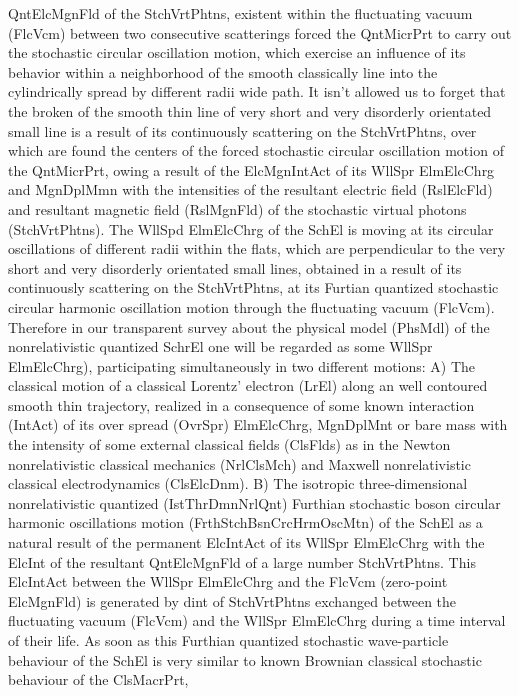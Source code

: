 \documentclass[12pt]{article}
\begin{document}
QntElcMgnFld of the StchVrtPhtns, existent within the fluctuating vacuum
(FlcVcm) between two consecutive scatterings forced the QntMicrPrt to carry 
out the stochastic circular oscillation motion, which exercise an influence
of its behavior within a neighborhood of the smooth classically line into
the cylindrically spread by different radii wide path. It isn't allowed us
to forget that the broken of the smooth thin line of very short and very
disorderly orientated small line is a result of its continuously scattering
on the StchVrtPhtns, over which are found the centers of the forced
stochastic circular oscillation motion of the QntMicrPrt, owing a result of
the ElcMgnIntAct of its WllSpr ElmElcChrg and MgnDplMmn with the intensities
of the resultant electric field (RslElcFld) and resultant magnetic field
(RslMgnFld) of the stochastic virtual photons (StchVrtPhtns). The WllSpd
ElmElcChrg of the SchEl is moving at its circular oscillations of different
radii within the flats, which are perpendicular to the very short and very
disorderly orientated small lines, obtained in a result of its continuously
scattering on the StchVrtPhtns, at its Furtian quantized stochastic circular
harmonic oscillation motion through the fluctuating vacuum (FlcVcm).
Therefore in our transparent survey about the physical model (PhsMdl) of the
nonrelativistic quantized SchrEl one will be regarded as some WllSpr
ElmElcChrg), participating simultaneously in two different motions: A) The
classical motion of a classical Lorentz' electron (LrEl) along an well
contoured smooth thin trajectory, realized in a consequence of some known
interaction (IntAct) of its over spread (OvrSpr) ElmElcChrg, MgnDplMnt or
bare mass with the intensity of some external classical fields (ClsFlds) as
in the Newton nonrelativistic classical mechanics (NrlClsMch) and Maxwell
nonrelativistic classical electrodynamics (ClsElcDnm). B) The isotropic
three-dimensional nonrelativistic quantized (IstThrDmnNrlQnt) Furthian
stochastic boson circular harmonic oscillations motion
(FrthStchBsnCrcHrmOscMtn) of the SchEl as a natural result of the permanent
ElcIntAct of its WllSpr ElmElcChrg with the ElcInt of the resultant
QntElcMgnFld of a large number StchVrtPhtns. This ElcIntAct between the
WllSpr ElmElcChrg and the FlcVcm (zero-point ElcMgnFld) is generated by dint
of StchVrtPhtns exchanged between the fluctuating vacuum (FlcVcm) and the
WllSpr ElmElcChrg during a time interval of their life.  As soon as this
Furthian quantized stochastic wave-particle behaviour of the SchEl is very
similar to known Brownian classical stochastic behaviour of the ClsMacrPrt,
\end{document}
